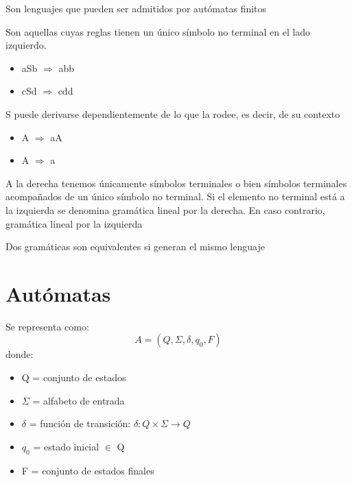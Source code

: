 \documentclass{apuntes}
\begin{document}
\begin{defn}
Son lenguajes que pueden ser admitidos por autómatas finitos
\end{defn}

\begin{defn}
Son aquellas cuyas reglas tienen un único símbolo no terminal en el lado izquierdo.
\end{defn}


\begin{example}
\begin{itemize}
\item aSb $\Rightarrow$ abb
\item cSd $\Rightarrow$ cdd
\end{itemize}
S puede derivarse dependientemente de lo que la rodee, es decir, de su contexto
\end{example}

\begin{example}
\begin{itemize}
\item A $\Rightarrow$ aA
\item A $\Rightarrow$ a
\end{itemize}
A la derecha tenemos únicamente símbolos terminales o bien símbolos terminales acompañados de un único símbolo no terminal.
Si el elemento no terminal está a la izquierda se denomina gramática lineal por la derecha. En caso contrario, gramática lineal por la izquierda
\end{example}

\begin{defn}
Dos gramáticas son equivalentes si generan el mismo lenguaje
\end{defn}

\chapter{Autómatas}
\begin{defn}[Autómata]
Se representa como:
\[ A=(Q, \Sigma, \delta, q_0, F)\]
 donde:
\begin{itemize}
\item Q = conjunto de estados
\item $\Sigma$ =  alfabeto de entrada
\item $\delta$ = función de transición: $\delta : Q\times \Sigma \rightarrow Q$
\item $q_0$ = estado inicial $\in$ Q
\item F = conjunto de estados finales
\end{itemize}
\end{defn}
\end{document}
